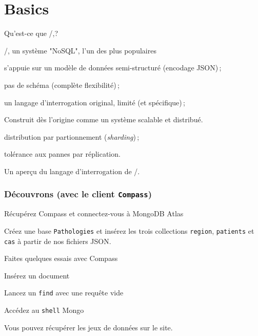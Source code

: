 

\section{Basics}

\begin{frame}{Qu'est-ce que \mongodb/,?}


\mongodb/, un système "NoSQL", l'un des plus populaires

\begin{redbullet}
  \item s'appuie sur un modèle de données semi-structuré (encodage JSON)\,;
  \item pas de schéma (complète flexibilité)\,;
  \item un \alert{langage d'interrogation} original, limité (et spécifique)\,;
   \end{redbullet}
   \vfill
   
Construit dès l'origine comme un système \alert{scalable} et \alert{distribué}.

\begin{redbullet}
 \item distribution par partionnement (\textit{sharding})\,;
  \item tolérance aux pannes par réplication.
\end{redbullet}   


\vfill

Un aperçu du \alert{langage d'interrogation} de \mongodb/.


\end{frame}


\begin{frame}
\frametitle{Découvrons (avec le client \texttt{Compass})}

Récupérez Compass et connectez-vous à MongoDB Atlas
\vfill

Créez une base \texttt{Pathologies} et insérez les trois collections
\texttt{region}, \texttt{patients} et \texttt{cas} à partir de nos
fichiers JSON.

\vfill 

Faites quelques essais avec Compass

\vfill

\begin{redbullet}
  \item Insérez un document
  \item Lancez un \texttt{find} avec une requête vide
  \item Accédez au \texttt{shell} Mongo
\end{redbullet}

\vfill

\begin{noteblock}
Vous pouvez récupérer les jeux
de données sur le site.
\end{noteblock}
\end{frame}




